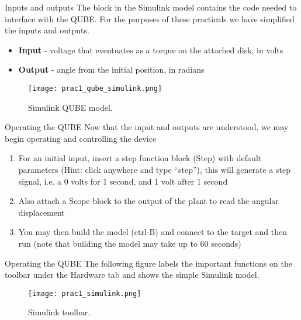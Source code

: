 \documentclass[9pt]{beamer-control}
\begin{document}

\begin{frame}{Inputs and outputs}
The block in the Simulink model contains the code needed to interface with the QUBE. For the purposes of these practicals we have simplified the inputs and outputs. 

\begin{itemize}
	\item \textbf{Input} - voltage that eventuates as a torque on the attached disk, in volts
	\item \textbf{Output} - angle from the initial position, in radians
\end{itemize}

\begin{figure}
	\centering
	\texttt{[image: prac1\_qube\_simulink.png]}
	\caption{Simulink QUBE model.}
\end{figure}


\end{frame}




\begin{frame}{Operating the QUBE}
	Now that the input and outputs are understood, we may begin operating and controlling the device
	\begin{enumerate}
		\item For an initial input, insert a step function block (Step) with default parameters (Hint: click anywhere and type “step”), this will generate a step signal, i.e. a 0 volts for 1 second, and 1 volt after 1 second
		\item Also attach a Scope block to the output of the plant to read the angular displacement
		\item You may then build the model (ctrl-B) and connect to the target and then run (note that building the model may take up to 60 seconds)
	\end{enumerate}

\end{frame}

\begin{frame}{Operating the QUBE}
	The following figure labels the important functions on the toolbar under the Hardware tab and shows the simple Simulink model.
\begin{figure}
	\centering
	\texttt{[image: prac1\_simulink.png]}
	\caption{Simulink toolbar.}
\end{figure}
\end{frame}
\end{document}
